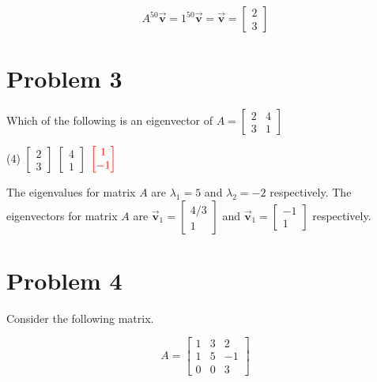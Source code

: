 \documentclass[letter,11pt]{article}
\theoremstyle{definition}
\begin{document}
$$\boxed{A^{50}\vec{\boldsymbol{v}} = 1^{50}\vec{\boldsymbol{v}}=\vec{\boldsymbol{v}} = \begin{bmatrix} 2\\3\end{bmatrix}}$$

\section{Problem 3}

Which of the following is an eigenvector of $A = \begin{bmatrix} 2 & 4\\ 3 & 1 \end{bmatrix}$
\begin{tasks}(4)
    \task $\begin{bmatrix} 2 \\ 3 \end{bmatrix}$
    \task $\begin{bmatrix} 4 \\ 1 \end{bmatrix}$
    \task $\textcolor{red}{\begin{bmatrix} 1\\-1 \end{bmatrix}}$
    \task {}
\end{tasks}

\begin{tcolorbox}[boxrule=1mm,enhanced jigsaw, breakable,before=\hfill,after=\hfill,adjusted title={Problem 3 solutions}]
    The eigenvalues for matrix $A$ are $\lambda_{1} = 5$ and $\lambda_{2} = -2$ respectively. The eigenvectors for matrix $A$ are $\vec{\boldsymbol{v}}_{1} = \begin{bmatrix} 4/3 \\ 1\end{bmatrix}$ and $\vec{\boldsymbol{v}}_{1} = \begin{bmatrix} -1 \\ 1\end{bmatrix}$ respectively. 
\end{tcolorbox}
\newpage
\section{Problem 4}
Consider the following matrix.

$$A= \begin{bmatrix} 1 & 3 & 2\\ 1 & 5 & -1\\ 0 & 0 & 3\end{bmatrix}$$
\end{document}
